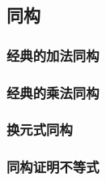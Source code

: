 \subsection{同构}

\subsubsection{经典的加法同构}

\subsubsection{经典的乘法同构}

\subsubsection{换元式同构}

\subsubsection{同构证明不等式}